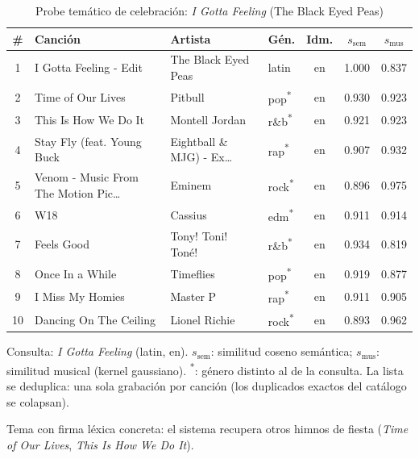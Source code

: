 \begin{table}[htbp]
  \centering
  \begin{threeparttable}
  \caption{Probe temático de celebración: \emph{I Gotta Feeling} (The Black Eyed Peas)}
  \label{tab:qual_probe_celebracion}
  \small
  \begin{tabular}{clllccc}
    \toprule
    \# & Canción & Artista & Gén. & Idm. & $s_{\text{sem}}$ & $s_{\text{mus}}$ \\
    \midrule
    1 & I Gotta Feeling - Edit & The Black Eyed Peas & latin & en & 1.000 & 0.837 \\
    2 & Time of Our Lives & Pitbull & pop\textsuperscript{*} & en & 0.930 & 0.923 \\
    3 & This Is How We Do It & Montell Jordan & r\&b\textsuperscript{*} & en & 0.921 & 0.923 \\
    4 & Stay Fly (feat. Young Buck & Eightball \& MJG) - Ex\ldots & rap\textsuperscript{*} & en & 0.907 & 0.932 \\
    5 & Venom - Music From The Motion Pic\ldots & Eminem & rock\textsuperscript{*} & en & 0.896 & 0.975 \\
    6 & W18 & Cassius & edm\textsuperscript{*} & en & 0.911 & 0.914 \\
    7 & Feels Good & Tony! Toni! Toné! & r\&b\textsuperscript{*} & en & 0.934 & 0.819 \\
    8 & Once In a While & Timeflies & pop\textsuperscript{*} & en & 0.919 & 0.877 \\
    9 & I Miss My Homies & Master P & rap\textsuperscript{*} & en & 0.911 & 0.905 \\
    10 & Dancing On The Ceiling & Lionel Richie & rock\textsuperscript{*} & en & 0.893 & 0.962 \\
    \bottomrule
  \end{tabular}
  \begin{tablenotes}[flushleft]
    \small
    \item Consulta: \emph{I Gotta Feeling} (latin, en). $s_{\text{sem}}$: similitud coseno semántica; $s_{\text{mus}}$: similitud musical (kernel gaussiano). \textsuperscript{*}: género distinto al de la consulta. La lista se deduplica: una sola grabación por canción (los duplicados exactos del catálogo se colapsan).
    \item Tema con firma léxica concreta: el sistema recupera otros himnos de fiesta (\emph{Time of Our Lives}, \emph{This Is How We Do It}).
  \end{tablenotes}
  \end{threeparttable}
\end{table}